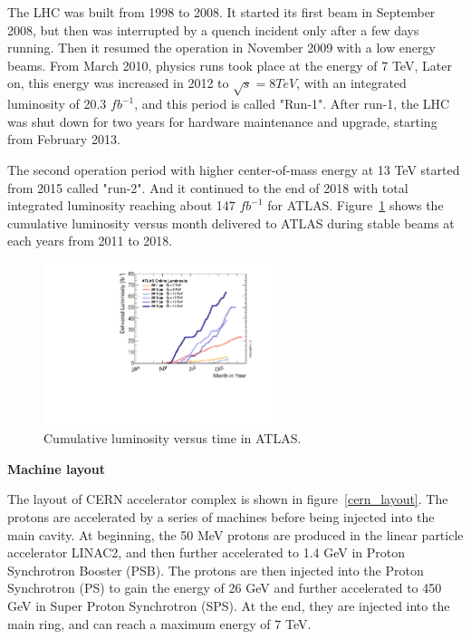 The LHC was built from 1998 to 2008. 
It started its first beam in September 2008, but then was interrupted by a quench incident only after a few days running.
Then it resumed the operation in November 2009 with a low energy beams.
From March 2010, physics runs took place at the energy of 7 TeV,
Later on, this energy was increased in 2012 to $\sqrt{s} = 8 TeV$, with an integrated luminosity of 20.3 $fb^{-1}$,
and this period is called "Run-1".
After run-1, the LHC was shut down for two years for hardware maintenance and upgrade, starting from February 2013.

The second operation period with higher center-of-mass energy at 13 TeV started from 2015 called "run-2".
And it continued to the end of 2018 with total integrated luminosity reaching about 147 $fb^{-1}$ for ATLAS.
Figure~\ref{fig:lumi_vs_month} shows the cumulative luminosity versus month delivered to ATLAS during stable beams 
at each years from 2011 to 2018.
\begin{figure}[!htb]
  \centering
  \includegraphics[width=0.6\textwidth]{figures/Detector/intlumivsyear.pdf}
  \caption{Cumulative luminosity versus time in ATLAS.}
  \label{fig:lumi_vs_month}
\end{figure}

\textbf{Machine layout}

The layout of CERN accelerator complex is shown in figure~\ref{cern_layout}.
The protons are accelerated by a series of machines before being injected into the main cavity.
At beginning, the 50 MeV protons are produced in the linear particle accelerator LINAC2, 
and then further accelerated to 1.4 GeV in Proton Synchrotron Booster (PSB).
The protons are then injected into the Proton Synchrotron (PS) to gain the energy of 26 GeV
and further accelerated to 450 GeV in Super Proton Synchrotron (SPS).
At the end, they are injected into the main ring, and can reach a maximum energy of 7 TeV.

